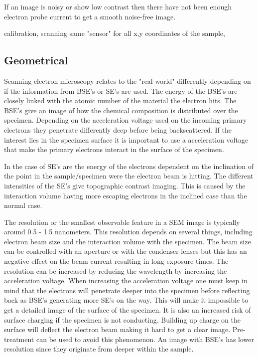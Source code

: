 If an image is noisy or show low contrast then there have not been enough electron probe current to get a smooth noise-free image. 

calibration, scanning same "sensor" for all x,y coordinates of the sample, 

\subsection*{Geometrical}
Scanning electron microscopy relates to the "real world" differently depending on if the information from BSE's or SE's are used. The energy of the BSE's are closely linked with the atomic number of the material the electron hits. The BSE's give an image of how the chemical composition is distributed over the specimen. Depending on the acceleration voltage used on the incoming primary electrons they penetrate differently deep before being backscattered. If the interest lies in the specimen surface it is important to use a acceleration voltage that make the primary electrons interact in the surface of the specimen. 

In the case of SE's are the energy of the electrons dependent on the inclination of the point in the sample/specimen were the electron beam is hitting. The different intensities of the SE's give topographic contrast imaging. This is caused by the interaction volume having more escaping electrons in the inclined case than the normal case.

The resolution or the smallest observable feature in a SEM image is typically around 0.5 - 1.5 nanometers. This resolution depends on several things, including electron beam size and the interaction volume with the specimen. The beam size can be controlled with an aperture or with the condenser lenses but this has an negative effect on the beam current resulting in long exposure times. The resolution can be increased by reducing the wavelength by increasing the acceleration voltage. When increasing the acceleration voltage one must keep in mind that the electrons will penetrate deeper into the specimen before reflecting back as BSE's generating more SE's on the way. This will make it impossible to get a detailed image of the surface of the specimen. It is also an increased risk of surface charging if the specimen is not conducting. Building up charge on the surface will deflect the electron beam making it hard to get a clear image. Pre-treatment can be used to avoid this phenomenon. An image with BSE's has lower resolution since they originate from deeper within the sample. 

